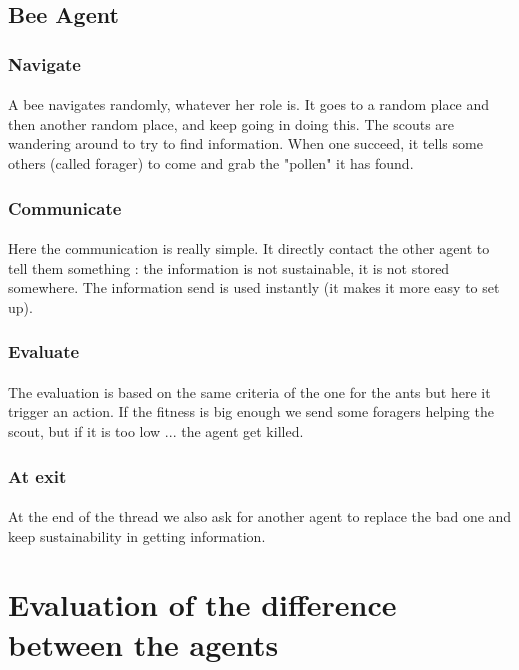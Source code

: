 \documentclass{article}
\begin{document}
	\subsection{Bee Agent}
		\subsubsection{Navigate}
			\paragraph{}
			A bee navigates randomly, whatever her role is.
			It goes to a random place and then another random place, and keep going in doing this.
			The scouts are wandering around to try to find information.
			When one succeed, it tells some others (called forager) to come and grab the "pollen" it has found.
		\subsubsection{Communicate}
			\paragraph{}
			Here the communication is really simple.
			It directly contact the other agent to tell them something : the information is not sustainable, it is not stored somewhere.
			The information send is used instantly (it makes it more easy to set up).
		\subsubsection{Evaluate}
			\paragraph{}
			The evaluation is based on the same criteria of the one for the ants but here it trigger an action.
			If the fitness is big enough we send some foragers helping the scout, but if it is too low ... the agent get killed.
		\subsubsection{At exit}
			\paragraph{}
			At the end of the thread we also ask for another agent to replace the bad one and keep sustainability in getting information.
			
\section{Evaluation of the difference between the agents}
\end{document}

